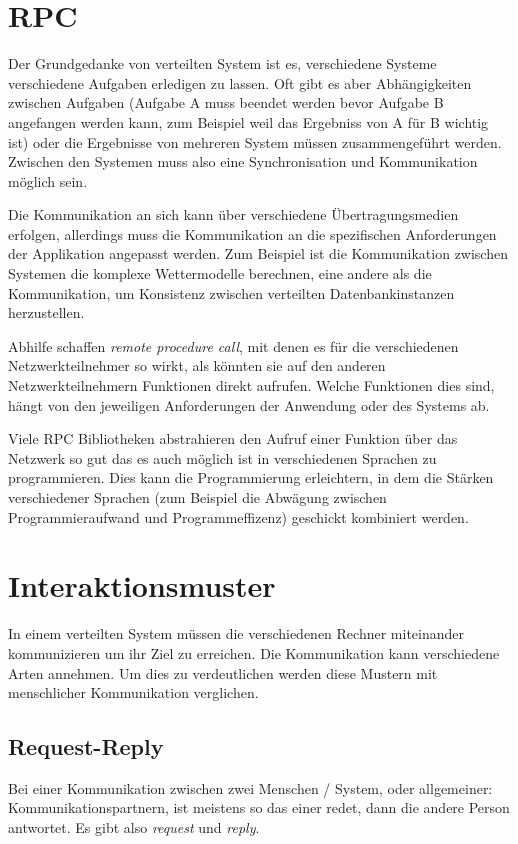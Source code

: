 \section{RPC}
Der Grundgedanke von verteilten System ist es, verschiedene Systeme verschiedene Aufgaben
erledigen zu lassen. Oft gibt es aber Abh{\"{a}}ngigkeiten zwischen Aufgaben (Aufgabe A muss beendet werden
bevor Aufgabe B angefangen werden kann, zum Beispiel weil das Ergebniss von A f{\"{u}}r B wichtig
ist) oder die Ergebnisse von mehreren System m{\"{u}}ssen zusammengef{\"{u}}hrt werden. Zwischen
den Systemen muss also eine Synchronisation und Kommunikation m{\"{o}}glich sein.

Die Kommunikation
an sich kann {\"{u}}ber verschiedene {\"{U}}bertragungsmedien erfolgen, allerdings muss die
Kommunikation an die spezifischen Anforderungen der Applikation angepasst werden. Zum Beispiel
ist die Kommunikation zwischen Systemen die komplexe Wettermodelle berechnen, eine andere als die
Kommunikation, um Konsistenz zwischen verteilten Datenbankinstanzen herzustellen.

Abhilfe schaffen \textit{remote procedure call}, mit denen es f{\"{u}}r die verschiedenen Netzwerkteilnehmer
so wirkt, als k{\"{o}}nnten sie auf den anderen Netzwerkteilnehmern Funktionen direkt aufrufen. Welche
Funktionen dies sind, h{\"{a}}ngt von den jeweiligen Anforderungen der Anwendung oder des Systems ab.

Viele RPC Bibliotheken abstrahieren den Aufruf einer Funktion {\"{u}}ber das Netzwerk so gut das es auch
m{\"{o}}glich ist in verschiedenen Sprachen zu programmieren. Dies kann die Programmierung erleichtern, in dem
die St{\"{a}}rken verschiedener Sprachen (zum Beispiel die Abw{\"{a}}gung zwischen Programmieraufwand und
Programmeffizenz) geschickt kombiniert werden.

\clearpage
\section{Interaktionsmuster}
In einem verteilten System m{\"{u}}ssen die verschiedenen Rechner miteinander kommunizieren um
ihr Ziel zu erreichen. Die Kommunikation kann verschiedene Arten annehmen. Um dies zu verdeutlichen
werden diese Mustern mit menschlicher Kommunikation verglichen.

\subsection{Request-Reply}
Bei einer Kommunikation zwischen zwei Menschen / System, oder allgemeiner: Kommunikationspartnern,
ist meistens so das einer redet, dann die andere Person antwortet. Es gibt also \textit{request}
und \textit{reply}.

